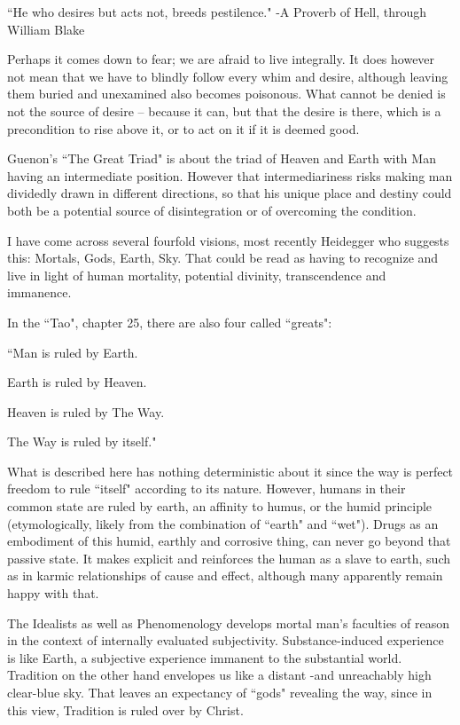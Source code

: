 \begin{footnotesize}
\begin{sffamily}
``He who desires but acts not, breeds pestilence." -A Proverb of Hell, through William Blake

Perhaps it comes down to fear; we are afraid to live integrally. It does however not mean that we have to blindly follow every whim and desire, although leaving them buried and unexamined also becomes poisonous. What cannot be denied is not the source of desire – because it can, but that the desire is there, which is a precondition to rise above it, or to act on it if it is deemed good.

Guenon's ``The Great Triad" is about the triad of Heaven and Earth with Man having an intermediate position. However that intermediariness risks making man dividedly drawn in different directions, so that his unique place and destiny could both be a potential source of disintegration or of overcoming the condition.

I have come across several fourfold visions, most recently Heidegger who suggests this: Mortals, Gods, Earth, Sky. That could be read as having to recognize and live in light of human mortality, potential divinity, transcendence and immanence.

In the ``Tao", chapter 25, there are also four called ``greats":

``Man is ruled by Earth.

Earth is ruled by Heaven.

Heaven is ruled by The Way.

The Way is ruled by itself."

What is described here has nothing deterministic about it since the way is perfect freedom to rule ``itself" according to its nature. However, humans in their common state are ruled by earth, an affinity to humus, or the humid principle (etymologically, likely from the combination of ``earth" and ``wet"). Drugs as an embodiment of this humid, earthly and corrosive thing, can never go beyond that passive state. It makes explicit and reinforces the human as a slave to earth, such as in karmic relationships of cause and effect, although many apparently remain happy with that. 

The Idealists as well as Phenomenology develops mortal man's faculties of reason in the context of internally evaluated subjectivity. Substance-induced experience is like Earth, a subjective experience immanent to the substantial world. Tradition on the other hand envelopes us like a distant -and unreachably high clear-blue sky. That leaves an expectancy of ``gods" revealing the way, since in this view, Tradition is ruled over by Christ. 


\end{sffamily}
\end{footnotesize}

